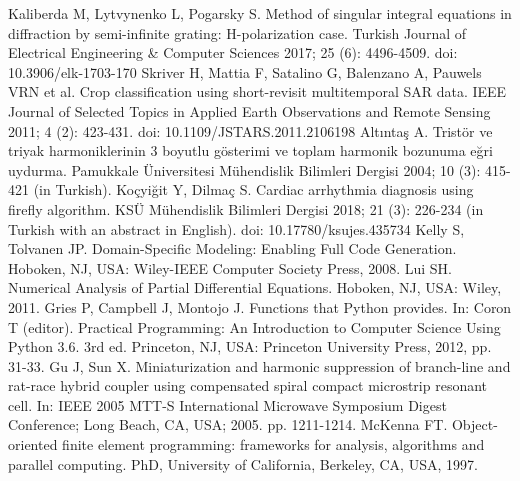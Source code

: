 \documentclass{elektr}
\begin{document}
\begin{thebibliography}{99}
 Kaliberda M, Lytvynenko L, Pogarsky S. Method of singular integral equations in diffraction by semi-infinite grating: H-polarization case. Turkish Journal of Electrical Engineering \& Computer Sciences 2017; 25 (6): 4496-4509. doi: 10.3906/elk-1703-170 
 Skriver H, Mattia F, Satalino G, Balenzano A, Pauwels VRN et al. Crop classification using short-revisit multitemporal SAR data. IEEE Journal of Selected Topics in Applied Earth Observations and Remote Sensing 2011; 4 (2): 423-431. doi: 10.1109/JSTARS.2011.2106198
 Alt{\i}nta\c{s} A. Trist\"{o}r ve triyak harmoniklerinin 3 boyutlu g\"{o}sterimi ve toplam harmonik bozunuma e\u{g}ri uydurma. Pamukkale \"{U}niversitesi M\"{u}hendislik Bilimleri Dergisi 2004; 10 (3): 415-421 (in Turkish).
 Ko\c{c}yi\u{g}it Y, Dilma\c{c} S. Cardiac arrhythmia diagnosis using firefly algorithm. KS\"{U} M\"{u}hendislik Bilimleri Dergisi 2018; 21 (3): 226-234 (in Turkish with an abstract in English). doi: 10.17780/ksujes.435734 
 Kelly S, Tolvanen JP. Domain-Specific Modeling: Enabling Full Code Generation. Hoboken, NJ, USA: Wiley-IEEE Computer Society Press, 2008.
 Lui SH. Numerical Analysis of Partial Differential Equations. Hoboken, NJ, USA: Wiley, 2011.
 Gries P, Campbell J, Montojo J. Functions that Python provides. In: Coron T (editor). Practical Programming: An Introduction to Computer Science Using Python 3.6. 3rd ed. Princeton, NJ, USA: Princeton University Press, 2012, pp. 31-33.
 Gu J, Sun X. Miniaturization and harmonic suppression of branch-line and rat-race hybrid coupler using compensated spiral compact microstrip resonant cell. In: IEEE 2005 MTT-S International Microwave Symposium Digest Conference; Long Beach, CA, USA; 2005. pp. 1211-1214.
 McKenna FT. Object-oriented finite element programming: frameworks for analysis, algorithms and parallel computing. PhD, University of California, Berkeley, CA, USA, 1997.
\end{thebibliography}
\end{document}
